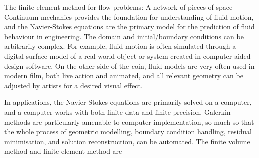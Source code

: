 \documentclass{article}
\begin{document}
\newpage
\vskip 0.2in
{\large The finite element method for flow problems: A network of pieces of space}
\vskip 0.2in
Continuum mechanics provides the foundation for understanding of fluid motion, and the Navier-Stokes equations
are the primary model for the prediction of fluid behaviour in engineering.
The domain and initial/boundary conditions can be arbitrarily complex. For example, fluid motion is often simulated
through a digital surface model of a real-world object or system created in computer-aided design software.
On the other side of the coin, fluid models are very often used in modern film, both live action and animated,
and all relevant geometry can be adjusted by artists for a desired visual effect.

In applications, the Navier-Stokes equations are primarily
solved on a computer, and a computer works with both finite data and finite precision.
Galerkin methods 
are particularly amenable to computer implementation, so much so that the whole process of geometric modelling, boundary condition handling,
residual minimisation, and solution reconstruction, can be automated. The finite volume method and finite element method are
\end{document}
